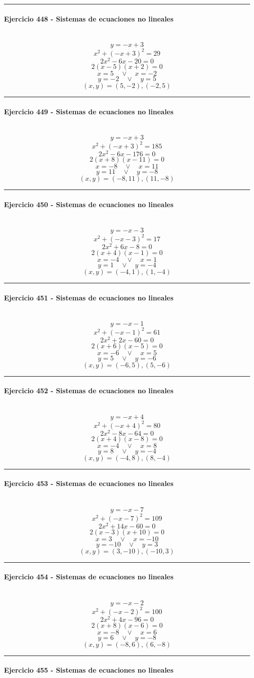 \documentclass[10pt,a4paper]{article}
\newcommand{\res}[1]{\paragraph{#1}\mbox{}\\[-1.2em]}
\begin{document}
\vspace{1mm}\hrule\vspace{2mm}
\res{Ejercicio 448 - Sistemas de ecuaciones no lineales}
\[ y=-x+3 \]
\[ x^2+(-x+3)^2=29 \]
\[ 2 x^{2} - 6 x - 20=0 \]
\[ 2(x-5)(x+2)=0 \]
\[ x=5\quad \vee \quad x=-2 \]
\[ y=-2\quad \vee \quad y=5 \]
\[ \boxed{(x,y)=(5,-2),(-2,5)} \]
\vspace{1mm}\hrule\vspace{2mm}
\res{Ejercicio 449 - Sistemas de ecuaciones no lineales}
\[ y=-x+3 \]
\[ x^2+(-x+3)^2=185 \]
\[ 2 x^{2} - 6 x - 176=0 \]
\[ 2(x+8)(x-11)=0 \]
\[ x=-8\quad \vee \quad x=11 \]
\[ y=11\quad \vee \quad y=-8 \]
\[ \boxed{(x,y)=(-8,11),(11,-8)} \]
\vspace{1mm}\hrule\vspace{2mm}
\res{Ejercicio 450 - Sistemas de ecuaciones no lineales}
\[ y=-x-3 \]
\[ x^2+(-x-3)^2=17 \]
\[ 2 x^{2} + 6 x - 8=0 \]
\[ 2(x+4)(x-1)=0 \]
\[ x=-4\quad \vee \quad x=1 \]
\[ y=1\quad \vee \quad y=-4 \]
\[ \boxed{(x,y)=(-4,1),(1,-4)} \]
\vspace{1mm}\hrule\vspace{2mm}
\res{Ejercicio 451 - Sistemas de ecuaciones no lineales}
\[ y=-x-1 \]
\[ x^2+(-x-1)^2=61 \]
\[ 2 x^{2} + 2 x - 60=0 \]
\[ 2(x+6)(x-5)=0 \]
\[ x=-6\quad \vee \quad x=5 \]
\[ y=5\quad \vee \quad y=-6 \]
\[ \boxed{(x,y)=(-6,5),(5,-6)} \]
\vspace{1mm}\hrule\vspace{2mm}
\res{Ejercicio 452 - Sistemas de ecuaciones no lineales}
\[ y=-x+4 \]
\[ x^2+(-x+4)^2=80 \]
\[ 2 x^{2} - 8 x - 64=0 \]
\[ 2(x+4)(x-8)=0 \]
\[ x=-4\quad \vee \quad x=8 \]
\[ y=8\quad \vee \quad y=-4 \]
\[ \boxed{(x,y)=(-4,8),(8,-4)} \]
\vspace{1mm}\hrule\vspace{2mm}
\res{Ejercicio 453 - Sistemas de ecuaciones no lineales}
\[ y=-x-7 \]
\[ x^2+(-x-7)^2=109 \]
\[ 2 x^{2} + 14 x - 60=0 \]
\[ 2(x-3)(x+10)=0 \]
\[ x=3\quad \vee \quad x=-10 \]
\[ y=-10\quad \vee \quad y=3 \]
\[ \boxed{(x,y)=(3,-10),(-10,3)} \]
\vspace{1mm}\hrule\vspace{2mm}
\res{Ejercicio 454 - Sistemas de ecuaciones no lineales}
\[ y=-x-2 \]
\[ x^2+(-x-2)^2=100 \]
\[ 2 x^{2} + 4 x - 96=0 \]
\[ 2(x+8)(x-6)=0 \]
\[ x=-8\quad \vee \quad x=6 \]
\[ y=6\quad \vee \quad y=-8 \]
\[ \boxed{(x,y)=(-8,6),(6,-8)} \]
\vspace{1mm}\hrule\vspace{2mm}
\res{Ejercicio 455 - Sistemas de ecuaciones no lineales}
\end{document}
